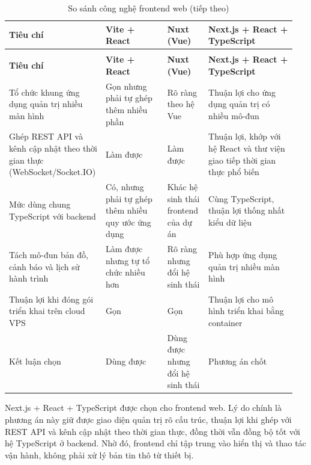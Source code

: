 \documentclass[a4paper]{extarticle}
\newcommand{\thesissettableid}[2]{%
  \renewcommand{\thetable}{#1}%
  \renewcommand{\theHtable}{#2}%
}
\begin{document}
{\thesissettableid{3.37}{condensed-bang-3-37-so-sanh-cong-nghe-frontend-web}
\def\LTcaptype{table}
\begin{longtable}{|L{0.279\linewidth}|L{0.216\linewidth}|L{0.148\linewidth}|L{0.308\linewidth}|}
\caption{So sánh công nghệ frontend web}\label{tab:condensed-bang-3-37-so-sanh-cong-nghe-frontend-web}\\
\hline
\textbf{Tiêu chí} & \textbf{Vite + React} & \textbf{Nuxt (Vue)} & \textbf{Next.js + React + TypeScript} \\
\hline
\endfirsthead
\caption[]{So sánh công nghệ frontend web (tiếp theo)}\\
\hline
\textbf{Tiêu chí} & \textbf{Vite + React} & \textbf{Nuxt (Vue)} & \textbf{Next.js + React + TypeScript} \\
\hline
\endhead
\endfoot
\endlastfoot
Tổ chức khung ứng dụng quản trị nhiều màn hình & Gọn nhưng phải tự ghép thêm nhiều phần & Rõ ràng theo hệ Vue & Thuận lợi cho ứng dụng quản trị có nhiều mô-đun \\\hline
Ghép REST API và kênh cập nhật theo thời gian thực (WebSocket/Socket.IO) & Làm được & Làm được & Thuận lợi, khớp với hệ React và thư viện giao tiếp thời gian thực phổ biến \\\hline
Mức dùng chung TypeScript với backend & Có, nhưng phải tự ghép thêm nhiều quy ước ứng dụng & Khác hệ sinh thái frontend của dự án & Cùng TypeScript, thuận lợi thống nhất kiểu dữ liệu \\\hline
Tách mô-đun bản đồ, cảnh báo và lịch sử hành trình & Làm được nhưng tự tổ chức nhiều hơn & Rõ ràng nhưng đổi hệ sinh thái & Phù hợp ứng dụng quản trị nhiều màn hình \\\hline
Thuận lợi khi đóng gói triển khai trên cloud VPS & Gọn & Gọn & Thuận lợi cho mô hình triển khai bằng container \\\hline
Kết luận chọn & Dùng được & Dùng được nhưng đổi hệ sinh thái & Phương án chốt \\\hline
\end{longtable}
}

Next.js + React + TypeScript được chọn cho frontend web. Lý do chính là phương
án này giữ được giao diện quản trị rõ cấu trúc, thuận lợi khi ghép với REST API
và kênh cập nhật theo thời gian thực, đồng thời vẫn đồng bộ tốt với hệ TypeScript ở backend. Nhờ đó,
frontend chỉ tập trung vào hiển thị và thao tác vận hành, không phải xử lý bản
tin thô từ thiết bị.
\end{document}
